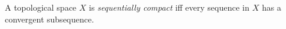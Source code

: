 A topological space $X$ is \emph{sequentially compact} iff every sequence in $X$ has a convergent subsequence.

